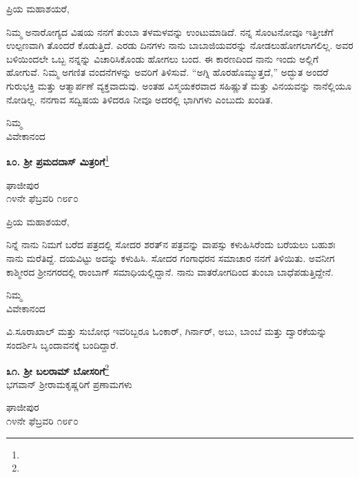 \noindent
ಪ್ರಿಯ ಮಹಾಶಯರೆ,

ನಿಮ್ಮ ಅನಾರೋಗ್ಯದ ವಿಷಯ ನನಗೆ ತುಂಬಾ ತಳಮಳವನ್ನು ಉಂಟುಮಾಡಿದೆ. ನನ್ನ ಸೊಂಟನೋವೂ ಇತ್ತೀಚೆಗೆ ಉಲ್ಪಣವಾಗಿ ತೊಂದರೆ ಕೊಡುತ್ತಿದೆ. ಎರಡು ದಿನಗಳು ನಾನು ಬಾಬಾಜಿಯವರನ್ನು ನೋಡಲುಹೋಗಲಾಗಲಿಲ್ಲ. ಅವರ ಬಳಿಯಿಂದಲೇ ಒಬ್ಬ ನನ್ನನ್ನು ವಿಚಾರಿಸಿಕೊಂಡು ಹೋಗಲು ಬಂದ. ಈ ಕಾರಣದಿಂದ ನಾನು ಇಂದು ಅಲ್ಲಿಗೆ ಹೋಗುವೆ. ನಿಮ್ಮ ಅಗಣಿತ ವಂದನೆಗಳನ್ನು ಅವರಿಗೆ ತಿಳಿಸುವೆ. “ಅಗ್ನಿ ಹೊರಹೊಮ್ಮುತ್ತದೆ,” ಅದ್ಭುತ \enginline{-} ಅಂದರೆ ಗುರುಭಕ್ತಿ ಮತ್ತು ಆತ್ಮಾರ್ಪಣೆ ವ್ಯಕ್ತವಾದುವು. ಅಂತಹ ವಿಸ್ಮಯಕರವಾದ ಸಹಿಷ್ಣುತೆ ಮತ್ತು ವಿನಯವನ್ನು ನಾನೆಲ್ಲಿಯೂ ನೋಡಿಲ್ಲ. ನನಗಾವ ಸದ್ವಿಷಯ ತಿಳಿದರೂ ನೀವೂ ಅದರಲ್ಲಿ ಭಾಗಿಗಳು ಎಂಬುದು ಖಂಡಿತ.

\vspace{-0.5cm}

{\flushright
ನಿಮ್ಮ\\ವಿವೇಕಾನಂದ\par}

\begin{center}
\textbf{೩೦. ಶ‍್ರೀ ಪ್ರಮದದಾಸ್ ಮಿತ್ರರಿಗೆ}\footnote{}
\end{center}

\vspace{-0.5cm}

\begin{flushright}
ಘಾಜೀಪುರ\\೧೪ನೇ ಫೆಬ್ರವರಿ ೧೮೯೦
\end{flushright}

\noindent
ಪ್ರಿಯ ಮಹಾಶಯರೆ,

ನಿನ್ನೆ ನಾನು ನಿಮಗೆ ಬರೆದ ಪತ್ರದಲ್ಲಿ ಸೋದರ ಶರತ್‌ನ ಪತ್ರವನ್ನು ವಾಪಸ್ಸು ಕಳುಹಿಸಿರೆಂದು ಬರೆಯಲು ಬಹುಶಃ ನಾನು ಮರೆತಿದ್ದೆ. ದಯವಿಟ್ಟು ಅದನ್ನು ಕಳುಹಿಸಿ. ಸೋದರ ಗಂಗಾಧರನ ಸಮಾಚಾರ ನನಗೆ ತಿಳಿಯಿತು. ಅವನೀಗ ಕಾಶ್ಮೀರದ ಶ‍್ರೀನಗರದಲ್ಲಿ ರಾಂಬಾಗ್ ಸಮಾಧಿಯಲ್ಲಿದ್ದಾನೆ. ನಾನು ವಾತರೋಗದಿಂದ ತುಂಬಾ ಬಾಧೆಪಡುತ್ತಿದ್ದೇನೆ.

{\flushright
ನಿಮ್ಮ\\ವಿವೇಕಾನಂದ\par}

ವಿ.ಸೂ\enginline{-}ರಾಖಾಲ್ ಮತ್ತು ಸುಬೋಧ ಇವರಿಬ್ಬರೂ ಓಂಕಾರ್, ಗಿರ್ನಾರ್‌, ಅಬು, ಬಾಂಬೆ ಮತ್ತು ದ್ವಾರಕೆಯನ್ನು ಸಂದರ್ಶಿಸಿ ಬೃಂದಾವನಕ್ಕೆ ಬಂದಿದ್ದಾರೆ.

\begin{center}
\textbf{೩೧. ಶ‍್ರೀ ಬಲರಾಮ್ ಬೋಸರಿಗೆ}\footnote{}\\ ಭಗವಾನ್ ಶ‍್ರೀರಾಮಕೃಷ್ಣರಿಗೆ ಪ್ರಣಾಮಗಳು
\end{center}

\vspace{-0.5cm}

\begin{flushright}
ಘಾಜೀಪುರ\\೧೪ನೇ ಫೆಬ್ರವರಿ ೧೮೯೦
\end{flushright}

